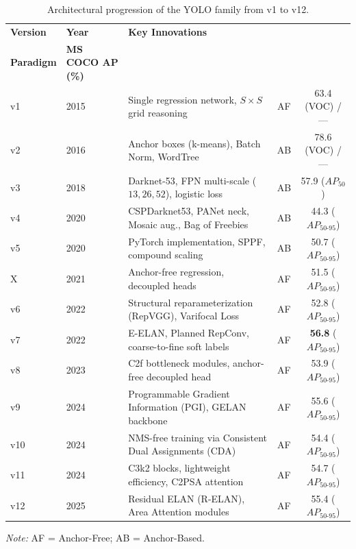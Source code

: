 \begin{table}[htbp]
\centering
\caption{Architectural progression of the YOLO family from v1 to v12.}
\label{tab:yolo-progression}
\begin{tabular}{|l|l|>{\raggedright\arraybackslash}p{6cm}|c|c|}
\hline
\textbf{Version} & \textbf{Year} & \textbf{Key Innovations} & \makecell{\textbf{Prediction}\\\textbf{Paradigm}} & \textbf{MS COCO AP (\%)} \\
\hline
v1  & 2015 & Single regression network, $S \times S$ grid reasoning & AF & 63.4 (VOC) / --- \\
\hline
v2  & 2016 & Anchor boxes (k-means), Batch Norm, WordTree & AB & 78.6 (VOC) / --- \\
\hline
v3  & 2018 & Darknet-53, FPN multi-scale ($13,26,52$), logistic loss & AB & 57.9 ($AP_{50}$) \\
\hline
v4  & 2020 & CSPDarknet53, PANet neck, Mosaic aug., Bag of Freebies & AB & 44.3 ($AP_{50\text{-}95}$) \\
\hline
v5  & 2020 & PyTorch implementation, SPPF, compound scaling & AB & 50.7 ($AP_{50\text{-}95}$) \\
\hline
X   & 2021 & Anchor-free regression, decoupled heads & AF & 51.5 ($AP_{50\text{-}95}$) \\
\hline
v6  & 2022 & Structural reparameterization (RepVGG), Varifocal Loss & AF & 52.8 ($AP_{50\text{-}95}$) \\
\hline
v7  & 2022 & E-ELAN, Planned RepConv, coarse-to-fine soft labels & AF & \textbf{56.8} ($AP_{50\text{-}95}$) \\
\hline
v8  & 2023 & C2f bottleneck modules, anchor-free decoupled head & AF & 53.9 ($AP_{50\text{-}95}$) \\
\hline
v9  & 2024 & Programmable Gradient Information (PGI), GELAN backbone & AF & 55.6 ($AP_{50\text{-}95}$) \\
\hline
v10 & 2024 & NMS-free training via Consistent Dual Assignments (CDA) & AF & 54.4 ($AP_{50\text{-}95}$) \\
\hline
v11 & 2024 & C3k2 blocks, lightweight efficiency, C2PSA attention & AF & 54.7 ($AP_{50\text{-}95}$) \\
\hline
v12 & 2025 & Residual ELAN (R-ELAN), Area Attention modules & AF & 55.4 ($AP_{50\text{-}95}$) \\
\hline
\end{tabular}

\vspace{0.3em}
{\footnotesize \textit{Note:} AF = Anchor-Free; AB = Anchor-Based.}
\end{table}

